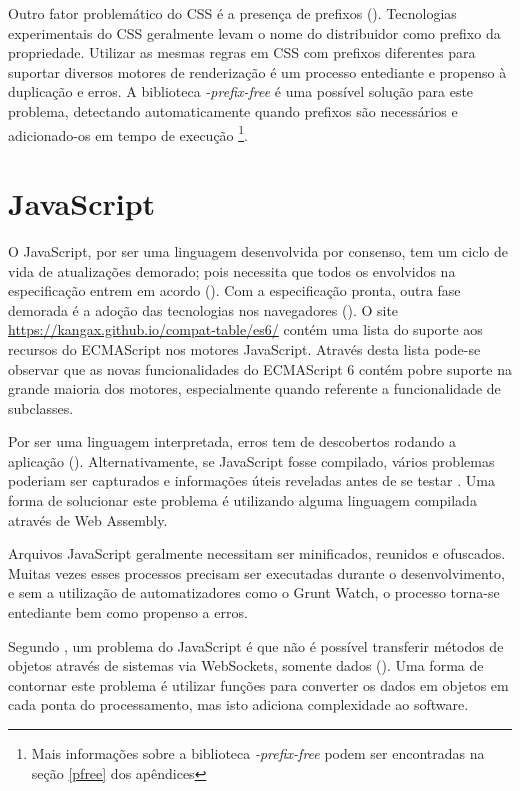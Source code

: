 Outro fator problemático do CSS é a presença de prefixos
(). Tecnologias experimentais do CSS geralmente
levam o nome do distribuidor como prefixo da propriedade. Utilizar as
mesmas regras em CSS com prefixos diferentes para suportar diversos
motores de renderização é um processo entediante e propenso à
duplicação e erros. A biblioteca \textit{-prefix-free} é uma
possível solução para este problema, detectando automaticamente
quando prefixos são necessários e adicionado-os em tempo de execução
\footnote{Mais informações sobre a biblioteca \textit{-prefix-free} podem ser encontradas na seção \ref{pfree}  dos
apêndices}.

\section{JavaScript}

O JavaScript, por ser uma linguagem desenvolvida por consenso,
tem um ciclo de vida de atualizações demorado; pois necessita
que todos os envolvidos na especificação entrem em acordo
(). Com a especificação
pronta, outra fase demorada é a adoção das tecnologias
nos navegadores (). O site
\url{https://kangax.github.io/compat-table/es6/} contém uma lista do
suporte aos recursos do ECMAScript nos motores JavaScript. Através
desta lista pode-se observar que as novas funcionalidades do ECMAScript
6 contém pobre suporte na grande maioria dos motores, especialmente
quando referente a funcionalidade de subclasses.

Por ser uma linguagem interpretada, erros tem de descobertos rodando a
aplicação (). Alternativamente,
se JavaScript fosse compilado, vários problemas poderiam ser capturados
e informações úteis reveladas antes de se testar \autocite[p.
12]{viabilityBusinessApplications}. Uma forma de solucionar 
este problema é utilizando alguma linguagem compilada através de 
Web Assembly.

Arquivos JavaScript geralmente necessitam ser minificados, reunidos e
ofuscados. Muitas vezes esses processos precisam ser executadas durante
o desenvolvimento, e sem a utilização de automatizadores como o Grunt
Watch, o processo torna-se entediante bem como propenso a erros.

Segundo \citet{htmlResearchJournal}, um problema do JavaScript é que
não é possível transferir métodos de objetos através de sistemas
via WebSockets, somente dados ().
Uma forma de contornar este problema é utilizar funções para
converter os dados em objetos em cada ponta do processamento, mas isto
adiciona complexidade ao software.

